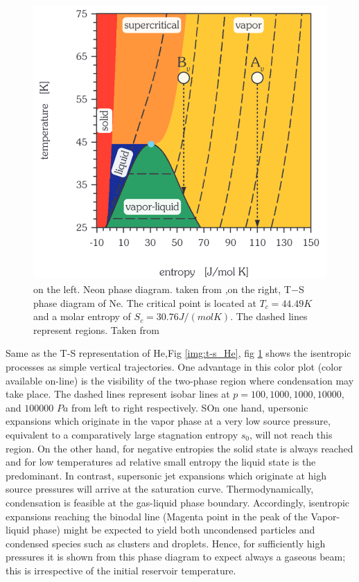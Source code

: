 \begin{figure}[hbtp]
\centering
\label{img:t-s_Ne}
\includegraphics[width= 8 cm]{../Images/T-s ne phase diagran.png} 
\caption{on the left. Neon phase diagram. taken from \cite{young_phase_nodate},on the right, T$-$S phase diagram of Ne. The critical point is located at $T_{c}= 44.49 K$ and a molar entropy of $S_{c}=30.76 J/(mol
K)$. The dashed lines represent regions. Taken from \cite{christen_supersonic_2010-1} }
\end{figure}

Same as the T-S representation of He,Fig \ref{img:t-s_He},  fig \ref{img:t-s_Ne} shows the  isentropic processes as simple vertical trajectories. One advantage in this color plot (color available on-line) is the visibility of the two-phase region where condensation may take place. The dashed lines represent isobar lines at $p= 100,1000,1000,10000,$ and $100000$ $Pa$ from left to right respectively. SOn one hand, upersonic expansions which originate in the vapor phase at a very low source pressure, equivalent to a comparatively large stagnation entropy $s_{0}$, will not reach this region. On the other hand, for negative entropies the solid state is always reached and for  low temperatures ad relative small entropy the liquid state is the predominant. 
In contrast, supersonic jet expansions which originate at high source pressures will arrive at the saturation curve. Thermodynamically, condensation is feasible at the gas-liquid phase boundary. Accordingly, isentropic expansions reaching the binodal line (Magenta point in the peak of the Vapor-liquid phase) might be expected to yield both uncondensed particles and condensed species such as clusters and droplets.
Hence, for sufficiently high pressures it is shown from this phase diagram to expect always a gaseous beam; this is irrespective of the initial reservoir temperature.


